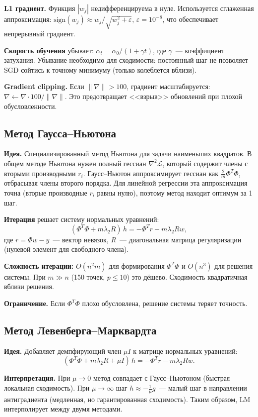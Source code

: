 \documentclass[12pt]{article}
\begin{document}
\textbf{L1 градиент.} Функция $|w_j|$ недифференцируема в нуле. Используется сглаженная аппроксимация: $\text{sign}(w_j) \approx w_j / \sqrt{w_j^2 + \varepsilon}$, $\varepsilon = 10^{-8}$, что обеспечивает непрерывный градиент.

\textbf{Скорость обучения} убывает: $\alpha_t = \alpha_0 / (1 + \gamma t)$, где $\gamma$~--- коэффициент затухания. Убывание необходимо для сходимости: постоянный шаг не позволяет SGD сойтись к точному минимуму (только колеблется вблизи).

\textbf{Gradient clipping.} Если $\|\nabla\| > 100$, градиент масштабируется: $\nabla \leftarrow \nabla \cdot 100 / \|\nabla\|$. Это предотвращает <<взрыв>> обновлений при плохой обусловленности.

\subsection{Метод Гаусса--Ньютона}

\textbf{Идея.} Специализированный метод Ньютона для задачи наименьших квадратов. В общем методе Ньютона нужен полный гессиан $\nabla^2 \mathcal{L}$, который содержит члены с вторыми производными $r_i$. Гаусс--Ньютон аппроксимирует гессиан как $\frac{2}{m}\Phi^T\Phi$, отбрасывая члены второго порядка. Для линейной регрессии эта аппроксимация точна (вторые производные $r_i$ равны нулю), поэтому метод находит оптимум за 1 шаг.

\textbf{Итерация} решает систему нормальных уравнений:
\[
    (\Phi^T\Phi + m\lambda_2 R)\, h = -\Phi^T r - m\lambda_2 R w,
\]
где $r = \Phi w - y$~--- вектор невязок, $R$~--- диагональная матрица регуляризации (нулевой элемент для свободного члена).

\textbf{Сложность итерации:} $O(n^2 m)$ для формирования $\Phi^T\Phi$ и $O(n^3)$ для решения системы. При $m \gg n$ (150 точек, $p \leq 10$) это дёшево. Сходимость квадратичная вблизи решения.

\textbf{Ограничение.} Если $\Phi^T\Phi$ плохо обусловлена, решение системы теряет точность.

\subsection{Метод Левенберга--Марквардта}

\textbf{Идея.} Добавляет демпфирующий член $\mu I$ к матрице нормальных уравнений:
\[
    (\Phi^T\Phi + m\lambda_2 R + \mu I)\, h = -\Phi^T r - m\lambda_2 R w.
\]

\textbf{Интерпретация.} При $\mu \to 0$ метод совпадает с Гаусс--Ньютоном (быстрая локальная сходимость). При $\mu \to \infty$ шаг $h \approx -\frac{1}{\mu}g$~--- малый шаг в направлении антиградиента (медленная, но гарантированная сходимость). Таким образом, LM интерполирует между двумя методами.
\end{document}
